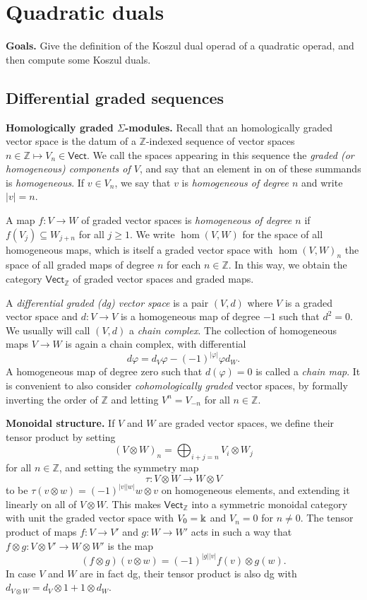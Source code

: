 
\section{Quadratic duals}\label{lecture:KD1}
\textbf{Goals.}
Give the definition of the Koszul dual
operad of a quadratic operad, and then compute
some Koszul duals.

\subsection{Differential graded sequences}


\textbf{Homologically graded $\Sigma$-modules.}
Recall that an homologically graded vector space is
the datum of a $\mathbb Z$-indexed sequence of vector
spaces $n\in\mathbb Z\longmapsto V_n\in\mathsf{Vect}$.
We call the spaces appearing in this sequence the \emph{graded (or
homogeneous) components of $V$}, and say that an element in 
on of these summands is \emph{homogeneous}. If
$v\in V_n$, we say that $v$ is \emph{homogeneous of
degree $n$} and write $|v|=n$. 

A map $f : V\longrightarrow W$ of graded vector spaces
is \emph{homogeneous of degree $n$} if $f(V_j)\subseteq W_{j+n}$ for
all $j\geqslant 1$. We write $\hom(V,W)$ for the
space of all homogeneous maps, which is itself a graded
vector space with $\hom(V,W)_n$ the space of all
graded maps of degree $n$ for each $n\in\mathbb Z$. 
In this way, we obtain the category $\mathsf{Vect}_\mathbb{Z}$
of graded vector spaces and graded maps. 

A \emph{differential graded (dg) vector space} is a pair 
$(V,d)$ where $V$ is a graded vector space and 
$d : V\longrightarrow V$ is a homogeneous map of degree 
$-1$ such that $d^2=0$. We usually will call $(V,d)$
a \emph{chain complex}. The collection of homogeneous
maps $V\longrightarrow W$ is again a chain
complex, with differential
\[ d\varphi 
	= d_V\varphi - (-1)^{|\varphi|} \varphi d_W. \]
A homogeneous map of degree zero such that $d(\varphi)=0$
is called a \emph{chain map}.
It is
convenient to also consider \emph{cohomologically graded}
vector spaces, by formally inverting the order of $\mathbb{Z}$
and letting $V^n = V_{-n}$ for all $n\in\mathbb Z$. 

\bigskip

\textbf{Monoidal structure.} If $V$ and $W$ are
graded vector spaces, we define their tensor product
by setting
\[ (V\otimes W)_n = \bigoplus_{i+j = n} V_i\otimes W_j \]
for all $n\in\mathbb Z$, and setting the symmetry map
\[\tau : V\otimes W \longrightarrow W\otimes V\]
to be $\tau(v\otimes w) = (-1)^{|v||w|}w\otimes v$
on homogeneous elements, and extending it linearly on all of
$V\otimes W$. This makes $\mathsf{Vect}_\mathbb{Z}$ into a
symmetric monoidal category with unit the graded vector
space with $V_0 = \Bbbk$ and $V_n = 0$ for $n\neq 0$.
The tensor product of maps $f: V\longrightarrow V'$
and $g : W\longrightarrow W'$ acts
in such a way that $f\otimes g : V\otimes V'
\longrightarrow W\otimes W'$ is the map
\[ (f\otimes g)(v\otimes w)  = (-1)^{|g||v|} f(v)\otimes g(w).\]
In case $V$ and $W$ are in fact dg, their tensor product is
also dg with $d_{V\otimes W} = d_V\otimes 1+ 1\otimes d_W$. 

